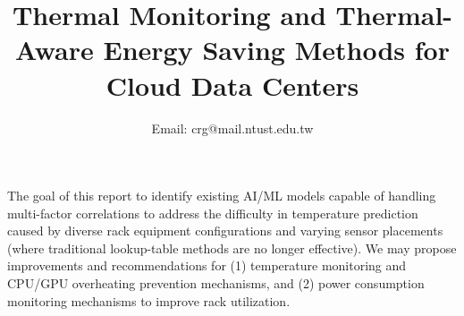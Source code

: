 \documentclass[conference]{IEEEtran}
\begin{document}
\title{Thermal Monitoring and Thermal-Aware Energy Saving Methods for Cloud Data Centers}
\author{
\author{
  Email: crg@mail.ntust.edu.tw
}

}

\maketitle

\begin{Abstract}
        The goal of this report to identify existing AI/ML models capable of handling multi-factor correlations to address the difficulty in temperature prediction caused by diverse rack equipment configurations and varying sensor placements (where traditional lookup-table methods are no longer effective). We may propose improvements and recommendations for
        (1) temperature monitoring and CPU/GPU overheating prevention mechanisms, and (2) power consumption monitoring mechanisms to improve rack utilization.
\end{Abstract}
\end{document}
